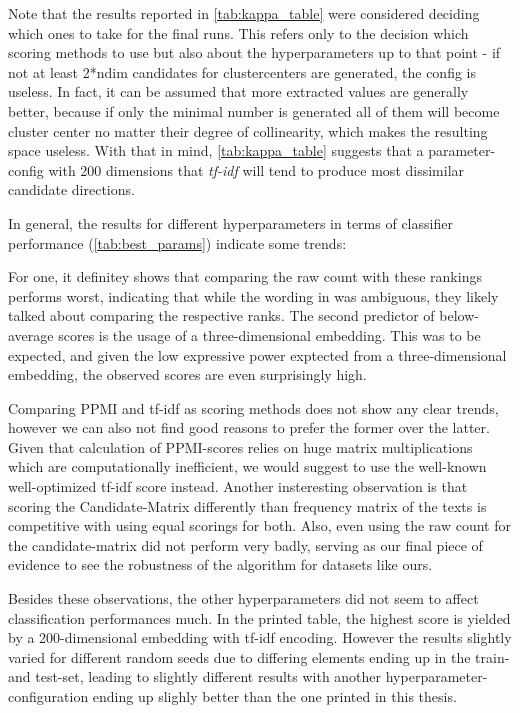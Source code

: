 Note that the results reported in \autoref{tab:kappa_table} were considered \wrt deciding which ones to take for the final runs. This refers only to the decision which scoring methods to use but also about the hyperparameters up to that point - if not at least 2*ndim candidates for clustercenters are generated, the config is useless. In fact, it can be assumed that more extracted values are generally better, because if only the minimal number is generated all of them will become cluster center no matter their degree of collinearity, which makes the resulting space useless. With that in mind, \autoref{tab:kappa_table} suggests that a parameter-config with 200 dimensions that \textit{tf-idf} will tend to produce most dissimilar candidate directions.

In general, the results for different hyperparameters in terms of classifier performance (\autoref{tab:best_params}) indicate some trends:

For one, it definitey shows that comparing the raw count with these rankings performs worst, indicating that while the wording in  was ambiguous, they likely talked about comparing the respective ranks. The second predictor of below-average scores is the usage of a three-dimensional embedding. This was to be expected, and given the low expressive power exptected from a three-dimensional embedding, the observed scores are even surprisingly high.

Comparing PPMI and tf-idf as scoring methods does not show any clear trends, however we can also not find good reasons to prefer the former over the latter. Given that calculation of PPMI-scores relies on huge matrix multiplications which are computationally inefficient, we would suggest to use the well-known well-optimized tf-idf score instead. Another insteresting observation is that scoring the Candidate-Matrix differently than frequency matrix of the texts is competitive with using equal scorings for both. Also, even using the raw count for the candidate-matrix did not perform very badly, serving as our final piece of evidence to see the robustness of the algorithm for datasets like ours.

Besides these observations, the other hyperparameters did not seem to affect classification performances much. In the printed table, the highest score is yielded by a 200-dimensional embedding with tf-idf encoding. However the results slightly varied for different random seeds due to differing elements ending up in the train- and test-set, leading to slightly different results with another hyperparameter-configuration ending up slighly better than the one printed in this thesis.

